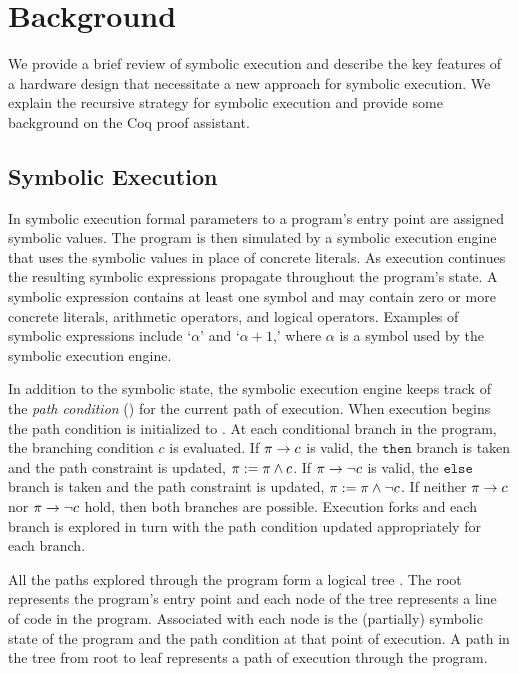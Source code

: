\section{Background}
We provide a brief review of symbolic execution and describe the key features
of a hardware design that necessitate a new approach for symbolic execution. We
explain the recursive strategy for symbolic execution and provide some
background on the Coq proof assistant.

\subsection{Symbolic Execution}
In symbolic execution formal parameters to a program's entry point are
assigned symbolic values. The program is then simulated by a symbolic execution
engine that uses the symbolic values in place of concrete literals. As
execution continues the resulting symbolic expressions propagate throughout the program's
state. A symbolic expression
\symexpression{} contains at least one symbol and may contain zero or more concrete
literals, arithmetic operators, and logical operators. Examples of
symbolic expressions include `$\alpha$' and `$\alpha + 1$,' where
$\alpha$ is a symbol used by the symbolic execution engine.

In addition to the symbolic state, the symbolic execution engine keeps track
of the \emph{path condition} (\pathcondition) for the current path of
execution. When execution begins the path condition is initialized 
to \texttrue. At each conditional branch in the program, the branching condition $c$ is evaluated. If $\pi
\rightarrow c$ is valid, the $\mathtt{then}$ branch is taken and the path constraint is
updated, $\pi := \pi \wedge c$. If $\pi \rightarrow \neg c$ is valid, the $\mathtt{else}$
branch is taken and the path constraint is updated, $\pi := \pi \wedge \neg
c$. If neither $\pi \rightarrow c$ nor $\pi \rightarrow \neg c$ hold, then both
branches are possible. Execution forks and each branch is explored in turn
with the path condition updated appropriately for each branch.

All the paths explored through the program form a logical tree \tree. The root represents the
program's entry point and each node of the
tree represents a line of code in the program. Associated with each node is the
(partially) symbolic state of the program and the path condition at that point
of execution. A path in the tree from root to leaf
represents a path of execution through the program.

